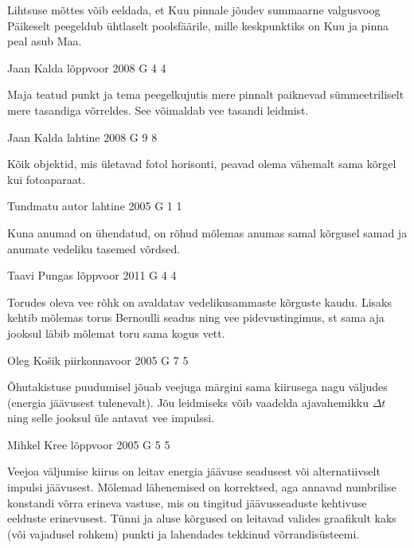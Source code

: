 \documentclass[11pt, twoside]{article}
\begin{document}
{{\ifHint
Lihtsuse mõttes võib eeldada, et Kuu pinnale jõudev summaarne valgusvoog Päikeselt peegeldub ühtlaselt poolsfäärile, mille keskpunktiks on Kuu ja pinna peal asub Maa.
\fi
}

{Jaan Kalda} %
{lõppvoor} %
{2008} %
{G 4} %
{4} %
{

\ifHint
Maja teatud punkt ja tema peegelkujutis mere pinnalt paiknevad sümmeetriliselt mere tasandiga võrreldes. See võimaldab vee tasandi leidmist.
\fi
}

{Jaan Kalda} %
{lahtine} %
{2008} %
{G 9} %
{8} %
{

\ifHint
Kõik objektid, mis ületavad fotol horisonti, peavad olema vähemalt sama kõrgel kui fotoaparaat.
\fi
}

{Tundmatu autor} %
{lahtine} %
{2005} %
{G 1} %
{1} %
{

\ifHint
Kuna anumad on ühendatud, on rõhud mõlemas anumas samal kõrgusel samad ja anumate vedeliku tasemed võrdsed.
\fi
}

{Taavi Pungas} %
{lõppvoor} %
{2011} %
{G 4} %
{4} %
{

\ifHint
Torudes oleva vee rõhk on avaldatav vedelikusammaste kõrguste kaudu. Lisaks kehtib mõlemas torus Bernoulli seadus ning vee pidevustingimus, st sama aja jooksul läbib mõlemat toru sama kogus vett.
\fi
}

{Oleg Košik} %
{piirkonnavoor} %
{2005} %
{G 7} %
{5} %
{

\ifHint
Õhutakistuse puudumisel jõuab veejuga märgini sama kiirusega nagu väljudes (energia jäävusest tulenevalt). Jõu leidmiseks võib vaadelda ajavahemikku $\Delta t$ ning selle jooksul üle antavat vee impulssi.
\fi
}

{Mihkel Kree} %
{lõppvoor} %
{2005} %
{G 5} %
{5} %
{

\ifHint
Veejoa väljumise kiirus on leitav energia jäävuse seadusest või alternatiivselt impulsi jäävusest. Mõlemad lähenemised on korrektsed, aga annavad numbrilise konstandi võrra erineva vastuse, mis on tingitud jäävusseaduste kehtivuse eelduste erinevusest. Tünni ja aluse kõrgused on leitavad valides graafikult kaks (või vajadusel rohkem) punkti ja lahendades tekkinud võrrandisüsteemi.
\fi
}

}
\end{document}
